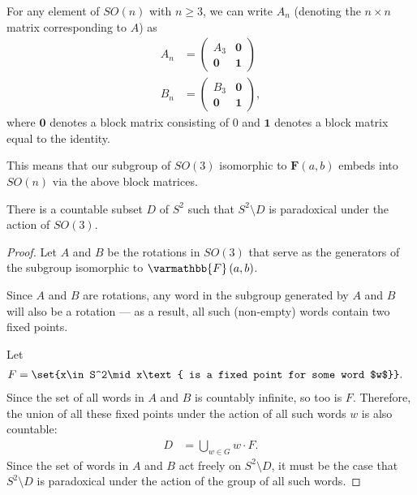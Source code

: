 \documentclass[12pt]{mypackage}
\renewcommand*{\mathbb}[1]{\varmathbb{#1}}
\begin{document}
\begin{remark}
  For any element of $SO(n)$ with $n \geq 3$, we can write $A_n$ (denoting the $n\times n$ matrix corresponding to $A$) as
  \begin{align*}
    A_n &= 
    \begin{pmatrix}
      A_3 & \mathbf{0}\\
      \mathbf{0} & \mathbf{1}
    \end{pmatrix}\\
    B_n &= \begin{pmatrix}B_3 & \mathbf{0}\\ \mathbf{0} & \mathbf{1}\end{pmatrix},
  \end{align*}
  where $\mathbf{0}$ denotes a block matrix consisting of $0$ and $\mathbf{1}$ denotes a block matrix equal to the identity.\newline

  This means that our subgroup of $SO(3)$ isomorphic to $\mathbf{F}\left(a,b\right)$ embeds into $SO(n)$ via the above block matrices.
\end{remark}
\begin{theorem}
  There is a countable subset $D$ of $S^2$ such that $S^2\setminus D$ is paradoxical under the action of $SO(3)$.
\end{theorem}
\begin{proof}
  Let $A$ and $B$ be the rotations in $SO(3)$ that serve as the generators of the subgroup isomorphic to $\mathbb{F}\left(a,b\right)$.\newline

  Since $A$ and $B$ are rotations, any word in the subgroup generated by $A$ and $B$ will also be a rotation --- as a result, all such (non-empty) words contain two fixed points.\newline

  Let
  \begin{align*}
    F &= \set{x\in S^2\mid x\text{ is a fixed point for some word $w$}}.
  \end{align*}
  Since the set of all words in $A$ and $B$ is countably infinite, so too is $F$. Therefore, the union of all these fixed points under the action of all such words $w$ is also countable:
  \begin{align*}
    D &= \bigcup_{w\in G} w\cdot F.
  \end{align*}
  Since the set of words in $A$ and $B$ act freely on $S^2\setminus D$, it must be the case that $S^{2}\setminus D$ is paradoxical under the action of the group of all such words.
\end{proof}
\end{document}
